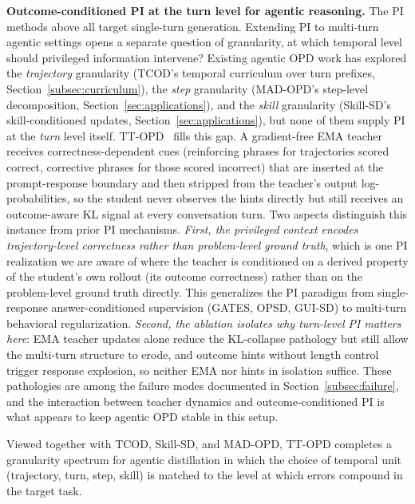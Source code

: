 \documentclass{article} %
\begin{document}
\textbf{Outcome-conditioned PI at the turn level for agentic reasoning.} The PI methods above all target single-turn generation. Extending PI to multi-turn agentic settings opens a separate question of granularity, at which temporal level should privileged information intervene? Existing agentic OPD work has explored the \emph{trajectory} granularity (TCOD's temporal curriculum over turn prefixes, Section~\ref{subsec:curriculum}), the \emph{step} granularity (MAD-OPD's step-level decomposition, Section~\ref{sec:applications}), and the \emph{skill} granularity (Skill-SD's skill-conditioned updates, Section~\ref{sec:applications}), but none of them supply PI at the \emph{turn} level itself. TT-OPD~\citep{2605.02943} fills this gap. A gradient-free EMA teacher receives correctness-dependent cues (reinforcing phrases for trajectories scored correct, corrective phrases for those scored incorrect) that are inserted at the prompt-response boundary and then stripped from the teacher's output log-probabilities, so the student never observes the hints directly but still receives an outcome-aware KL signal at every conversation turn. Two aspects distinguish this instance from prior PI mechanisms. \emph{First, the privileged context encodes trajectory-level correctness rather than problem-level ground truth}, which is one PI realization we are aware of where the teacher is conditioned on a derived property of the student's own rollout (its outcome correctness) rather than on the problem-level ground truth directly. This generalizes the PI paradigm from single-response answer-conditioned supervision (GATES, OPSD, GUI-SD) to multi-turn behavioral regularization. \emph{Second, the ablation isolates why turn-level PI matters here}: EMA teacher updates alone reduce the KL-collapse pathology but still allow the multi-turn structure to erode, and outcome hints without length control trigger response explosion, so neither EMA nor hints in isolation suffice. These pathologies are among the failure modes documented in Section~\ref{subsec:failure}, and the interaction between teacher dynamics and outcome-conditioned PI is what appears to keep agentic OPD stable in this setup.

Viewed together with TCOD, Skill-SD, and MAD-OPD, TT-OPD completes a granularity spectrum for agentic distillation in which the choice of temporal unit (trajectory, turn, step, skill) is matched to the level at which errors compound in the target task.
\end{document}
